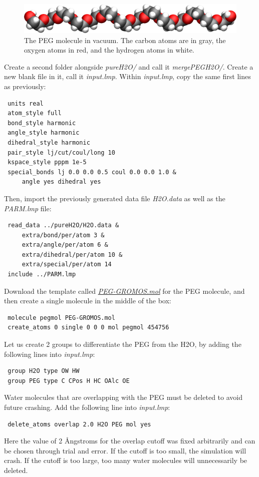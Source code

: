 \documentclass[9pt,tutorial]{livecoms}
\newcommand{\filepath}{https://raw.githubusercontent.com/lammpstutorials/lammpstutorials-article/main/files/}
\begin{document}
\begin{figure}
\centering
\includegraphics[width=\linewidth]{PEG-in-vacuum}
\caption{The PEG molecule in vacuum. The carbon atoms are in gray, the oxygen
atoms in red, and the hydrogen atoms in white.}
\label{fig:PEG-in-vacuum}
\end{figure}

Create a second folder alongside \textit{pureH2O/} and call it \textit{mergePEGH2O/}.
Create a new blank file in it, call it \textit{input.lmp}. Within \textit{input.lmp},
copy the same first lines as previously:
\begin{lstlisting}
 units real
 atom_style full
 bond_style harmonic
 angle_style harmonic
 dihedral_style harmonic
 pair_style lj/cut/coul/long 10
 kspace_style pppm 1e-5
 special_bonds lj 0.0 0.0 0.5 coul 0.0 0.0 1.0 &
     angle yes dihedral yes
\end{lstlisting}
Then, import the previously generated data file \textit{H2O.data} as well as the \textit{PARM.lmp} file:
\begin{lstlisting}
 read_data ../pureH2O/H2O.data &
     extra/bond/per/atom 3 &
     extra/angle/per/atom 6 &
     extra/dihedral/per/atom 10 &
     extra/special/per/atom 14
 include ../PARM.lmp
\end{lstlisting}
Download the template called
\href{\filepath tutorial3/mergePEGH2O/PEG-GROMOS.mol}{\textit{PEG-GROMOS.mol}}
for the PEG molecule, and then create a single molecule in the middle of the box:
\begin{lstlisting}
 molecule pegmol PEG-GROMOS.mol
 create_atoms 0 single 0 0 0 mol pegmol 454756
\end{lstlisting}
Let us create 2 groups to differentiate the PEG from the H2O, by adding the following
lines into \textit{input.lmp}:
\begin{lstlisting}
 group H2O type OW HW
 group PEG type C CPos H HC OAlc OE
\end{lstlisting}
Water molecules that are overlapping with the PEG must be deleted to avoid future crashing.
Add the following line into \textit{input.lmp}:
\begin{lstlisting}
 delete_atoms overlap 2.0 H2O PEG mol yes
\end{lstlisting}
Here the value of 2 Ångstroms for the overlap cutoff was fixed arbitrarily and can
be chosen through trial and error. If the cutoff is too small, the simulation will
crash. If the cutoff is too large, too many water molecules will unnecessarily be
deleted.
\end{document}
